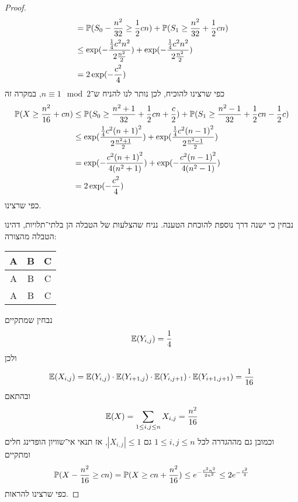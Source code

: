 \begin{proof}
\begin{align*}
		& = \mathbb{P}(S_0 - \frac{n^2}{32} \ge \frac{1}{2} cn) + \mathbb{P}(S_1 \ge \frac{n^2}{32} + \frac{1}{2} cn) \\
		& \le \exp(-\frac{\frac{1}{4} c^2 n^2}{2 \frac{n^2}{2}}) + \exp(-\frac{\frac{1}{4} c^2 n^2}{2 \frac{n^2}{2}}) \\
		& = 2\exp(-\frac{c^2}{4})
	\end{align*}
	כפי שרצינו להוכיח, לכן נותר לנו להניח ש־$n \equiv 1 \mod 2$, במקרה זה
	\begin{align*}
		\mathbb{P}(X \ge \frac{n^2}{16} + cn)
		& \le \mathbb{P}(S_0 \ge \frac{n^2 + 1}{32} + \frac{1}{2} cn + \frac{c}{2}) + \mathbb{P}(S_1 \ge \frac{n^2 - 1}{32} + \frac{1}{2} cn - \frac{1}{2} c) \\
		& \le \exp(\frac{\frac{1}{4} c^2 {(n + 1)}^2}{2 \frac{n^2 + 1}{2}}) + \exp(\frac{\frac{1}{4} c^2 {(n - 1)}^2}{2 \frac{n^2 - 1}{2}}) \\
		& = \exp(-\frac{c^2 {(n + 1)}^2}{4(n^2 + 1)}) + \exp(-\frac{c^2 {(n - 1)}^2}{4(n^2 - 1)}) \\
		& = 2 \exp(- \frac{c^2}{4})
	\end{align*}
	כפי שרצינו.

	נבחין כי ישנה דרך נוספת להוכחת הטענה.
	נניח שהצלעות של הטבלה הן בלתי־תלויות, דהינו הטבלה מהצורה:
	\begin{center}
		\begin{tabular}{||c || c || c ||}
			\hline\hline
			A & B & C \\
			\hline\hline
			A & B & C \\
			\hline\hline
			A & B & C \\
			\hline\hline
		\end{tabular}
	\end{center}
	נבחין שמתקיים
	\[
		\mathbb{E}(Y_{i, j}) = \frac{1}{4}
	\]
	ולכן
	\[
		\mathbb{E}(X_{i, j})
		= \mathbb{E}(Y_{i, j}) \cdot \mathbb{E}(Y_{i + 1, j}) \cdot \mathbb{E}(Y_{i, j + 1}) \cdot \mathbb{E}(Y_{i + 1, j + 1})
		= \frac{1}{16}
	\]
	ובהתאם
	\[
		\mathbb{E}(X)
		= \sum_{1 \le i, j \le n} X_{i, j}
		= \frac{n^2}{16}
	\]
	וכמובן גם מההגדרה לכל $1 \le i, j \le n$ גם $|X_{i, j}| \le 1$, אז תנאי אי־שוויון הופדינג חלים ומתקיים
	\[
		\mathbb{P}(X - \frac{n^2}{16} \ge cn)
		= \mathbb{P}(X \ge cn + \frac{n^2}{16})
		\le e^{-\frac{c^2 n^2}{2 n^2}}
		\le 2e^{-\frac{c^2}{4}}
	\]
	כפי שרצינו להראות.
\end{proof}

